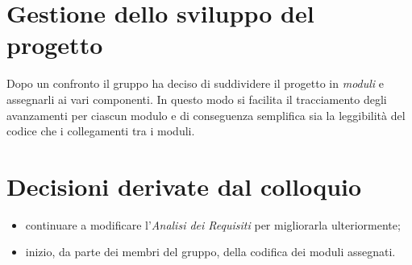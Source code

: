 \section{Gestione dello sviluppo del progetto}
Dopo un confronto il gruppo ha deciso di suddividere il progetto in \textit{moduli} e assegnarli ai vari componenti.
In questo modo si facilita il tracciamento degli avanzamenti per ciascun modulo e di conseguenza semplifica sia la leggibilità del codice che i collegamenti tra i moduli.


\section{Decisioni derivate dal colloquio}
  \begin{itemize}
    \item continuare a modificare l'\textit{Analisi dei Requisiti} per migliorarla ulteriormente;
    \item inizio, da parte dei membri del gruppo, della codifica dei moduli assegnati.
  \end{itemize}

